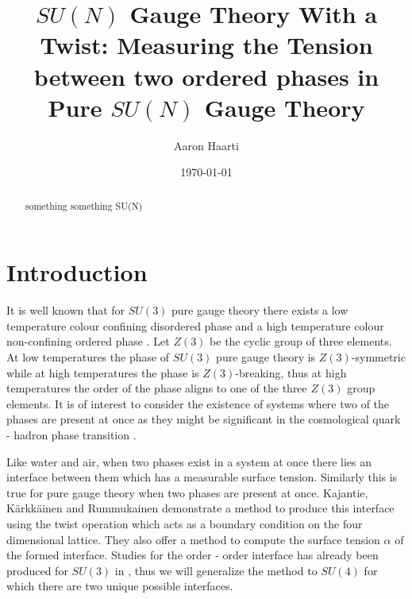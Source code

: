 \documentclass[english,twoside,openright]{UH_TCM_MSc}
\title{$SU(N)$ Gauge Theory With a Twist: Measuring the Tension between two ordered phases in Pure $SU(N)$ Gauge Theory}
\author{Aaron Haarti}
\date{\today}
\begin{document}
\maketitle


\begin{abstract}
something something SU(N)
\end{abstract}

\mytableofcontents

\mynomenclature

\chapter{Introduction}

It is well known that for $SU(3)$ pure gauge theory there exists a low temperature colour confining disordered phase and a high temperature colour non-confining ordered phase \cite{POLYAKOV1978477,PhysRevD.20.2610}. Let $Z(3)$ be the cyclic group of three elements. At low temperatures the phase of $SU(3)$ pure gauge theory is $Z(3)$-symmetric while at high temperatures the phase is $Z(3)$-breaking, thus at high temperatures the order of the phase aligns to one of the three $Z(3)$ group elements. It is of interest to consider the existence of systems where two of the phases are present at once as they might be significant in the cosmological quark - hadron phase transition \cite{FREI1989469}. 

Like water and air, when two phases exist in a system at once there lies an interface between them which has a measurable surface tension. Similarly this is true for pure gauge theory when two phases are present at once. Kajantie, Kärkkäinen and Rummukainen \cite{twist} demonstrate a method to produce this interface using the twist operation which acts as a boundary condition on the four dimensional lattice. They also offer a method to compute the surface tension $\alpha$ of the formed interface. Studies for the order - order interface has already been produced for $SU(3)$ in \cite{twist}, thus we will generalize the method to $SU(4)$ for which there are two unique possible interfaces. 
\end{document}
